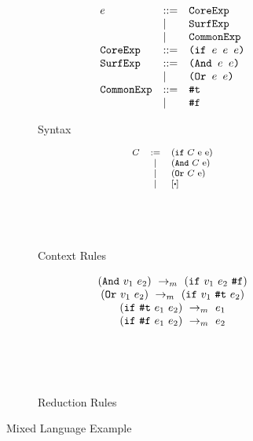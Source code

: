 \begin{figure}[t]
\centering
\begin{subfigure}{0.3\linewidth}{\footnotesize
    \begin{flushleft}
        \[
        \begin{array}{lll}
        e &::=& \mbox{\tt CoreExp} \\
        &|&\mbox{\tt SurfExp}\\
        &|&\mbox{\tt CommonExp}\\
        \mbox{\tt CoreExp} &::=& \texttt{(if~$e$~$e$~$e$)}\\
        \mbox{\tt SurfExp} &::=& \texttt{(And~$e$~$e$)}\\
        &|&\texttt{(Or~$e$~$e$)}\\
        \mbox{\tt CommonExp} &::=& \mbox{\tt \#t}\\
        &|& \mbox{\tt \#f}\\
        \end{array}
        \]
    \end{flushleft}
    \caption{Syntax}
    \label{fig:mixsyntax}
}
\end{subfigure}
\begin{subfigure}{0.2\linewidth}{\footnotesize
    \begin{flushleft}
        \[\footnotesize
        \begin{array}{lcl}
        C &:=& (\m{if}~C~$e$~$e$)\\
        &|& (\m{And}~C~$e$)\\
        &|& (\m{Or}~C~$e$)\\
        &|&[\bigcdot]\\[5em]
        \end{array}
        \]
        \end{flushleft}
    \caption{Context Rules}
    \label{fig:mixcontext}
}
\end{subfigure}
\begin{subfigure}{0.3\linewidth}{\footnotesize
    \begin{flushleft}
        \[
        \begin{array}{c}
        (\mbox{\tt And}~v_1~e_2) ~\rightarrow_m~(\mbox{\tt if}~v_1~e_2~\mbox{\tt \#f})\\
        (\mbox{\tt Or}~v_1~e_2) ~\rightarrow_m~(\mbox{\tt if}~v_1~\mbox{\tt \#t}~e_2)\\
        (\mbox{\tt if}~\mbox{\tt \#t}~e_1~e_2) ~\rightarrow_m~e_1\\
        (\mbox{\tt if}~\mbox{\tt \#f}~e_1~e_2) ~\rightarrow_m~e_2\\[5em]
        \end{array}
        \]
    \end{flushleft}
    \caption{Reduction Rules}
    \label{fig:mixreduction}
}
\end{subfigure}

\caption{Mixed Language Example}
\label{fig:mixexample}
\end{figure}


